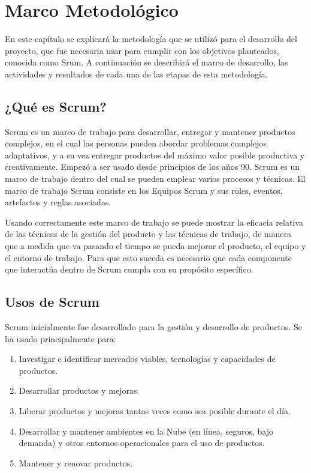 \chapter{Marco Metodológico}
En este capítulo se explicará la metodología que se utilizó para el desarrollo del proyecto, que fue necesaria usar para cumplir con los objetivos planteados, conocida como Srum. A continuación se describirá el marco de desarrollo, las actividades y resultados de cada una de las etapas de esta metodología.

\section{¿Qué es Scrum?}
Scrum es un marco de trabajo para desarrollar, entregar y mantener productos complejos, en el cual las personas pueden abordar problemas complejos adaptativos, y a su vez entregar productos del máximo valor posible productiva y creativamente. Empezó a ser usado desde principios de los años 90. Scrum es un marco de trabajo dentro del cual se pueden emplear varios procesos y técnicas. El marco de trabajo Scrum consiste en los Equipos Scrum y sus roles, eventos, artefactos y reglas asociadas. \cite{scrumSchwaber}

Usando correctamente este marco de trabajo se puede mostrar la eficacia relativa de las técnicas de la gestión del producto y las técnicas de trabajo, de manera que a medida que va pasando el tiempo se pueda mejorar el producto, el equipo y el entorno de trabajo. Para que esto suceda es necesario que cada componente que interactúa dentro de Scrum cumpla con su propósito específico.

\section{Usos de Scrum}
Scrum inicialmente fue desarrollado para la gestión y desarrollo de productos. Se ha usado principalmente para:

\begin{enumerate}
	\item Investigar e identificar mercados viables, tecnologías y capacidades de productos.
	\item Desarrollar productos y mejoras.
	\item Liberar productos y mejoras tantas veces como sea posible durante el día.
	\item Desarrollar y mantener ambientes en la Nube (en línea, seguros, bajo demanda) y otros entornos operacionales para el uso de productos.
	\item Mantener y renovar productos.
\end{enumerate}

